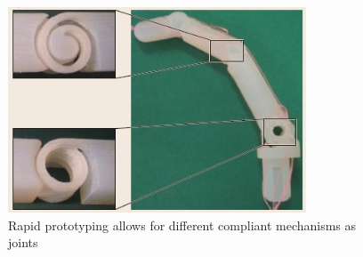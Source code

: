 \documentclass[a4paper, 10pt, conference]{ieeeconf}      %
\begin{document}
\begin{figure}[h!]
\centering  \includegraphics[scale=0.6]{./images/RapidPrototyping}
  \caption{Rapid prototyping allows for different compliant mechanisms as joints}
  \label{fig:RapidPrototyping}
	\end{figure}
\end{document}
